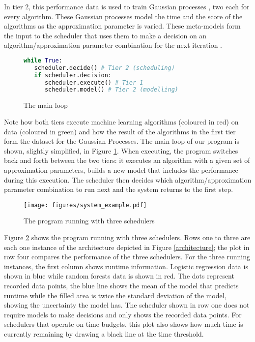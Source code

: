\documentclass[a4paper,12pt,twoside,openright]{report}
\begin{document}
In tier 2, this performance data is used to train Gaussian processes \raisebox{.5pt}{\textcircled{\raisebox{-.9pt} {4}}}, two each for every algorithm. These Gaussian processes model the time and the score of the algorithms as the approximation parameter is varied. These meta-models form the input to the scheduler \raisebox{.5pt}{\textcircled{\raisebox{-.9pt} {5}}} that uses them to make a decision on an algorithm/approximation parameter combination for the next iteration \raisebox{.5pt}{\textcircled{\raisebox{-.9pt} {6}}}.

\begin{figure}[ht]
\begin{lstlisting}[language=Python]
while True:
   scheduler.decide() # Tier 2 (scheduling)
   if scheduler.decision:
      scheduler.execute() # Tier 1
      scheduler.model() # Tier 2 (modelling)
\end{lstlisting}
\caption{The main loop}
\label{mainloop}
\end{figure}


Note how both tiers execute machine learning algorithms (coloured in red) on data (coloured in green) and how the result of the algorithms in the first tier form the dataset for the Gaussian Processes. The main loop of our program is shown, slightly simplified, in Figure \ref{mainloop}. When executing, the program switches back and forth between the two tiers: it executes an algorithm with a given set of approximation parameters, builds a new model that includes the performance during this execution. The scheduler then decides which algorithm/approximation parameter combination to run next and the system returns to the first step.

\begin{figure}[p]
    \centerline{\texttt{[image: figures/system\_example.pdf]}}
  \caption{The program running with three schedulers}
    \label{systemexample}
\end{figure}

Figure \ref{systemexample} shows the program running with three schedulers. Rows one to three are each one instance of the architecture depicted in Figure \ref{architecture}; the plot in row four compares the performance of the three schedulers. For the three running instances, the first column shows runtime information. Logistic regression data is shown in blue while random forests data is shown in red. The dots represent recorded data points, the blue line shows the mean of the model that predicts runtime while the filled area is twice the standard deviation of the model, showing the uncertainty the model has. The scheduler shown in row one does not require models to make decisions and only shows the recorded data points. For schedulers that operate on time budgets, this plot also shows how much time is currently remaining by drawing a black line at the time threshold.
\end{document}
